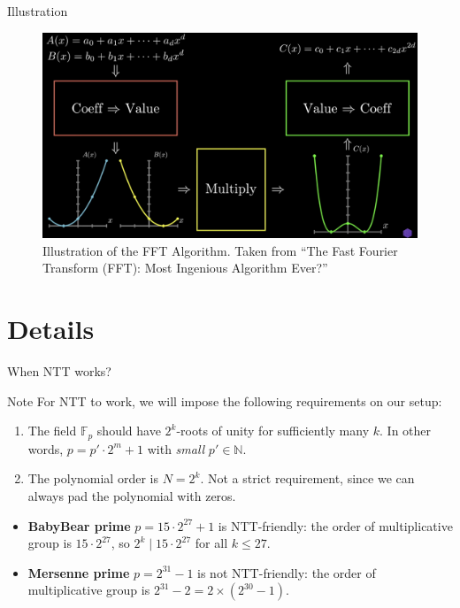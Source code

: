 \documentclass{zkdl-presentation-template}
\begin{document}
    \begin{frame}{Illustration}
        \begin{figure}
            \centering
            \includegraphics[width=\textwidth]{images/lecture_13/ntt_visualization.png}
            \caption{Illustration of the FFT Algorithm. Taken from ``The Fast Fourier Transform (FFT): Most Ingenious Algorithm Ever?''}
        \end{figure}
    \end{frame}

    \section{Details}

    \begin{frame}{When NTT works?}
        \begin{block}{Note}
            For NTT to work, we will impose the following requirements on 
            our setup:
            \begin{enumerate}
                \item The field $\mathbb{F}_p$ should have $2^k$-roots of unity for sufficiently many $k$. In other words, $p=p' \cdot 2^m + 1$ with \emph{small} $p' \in \mathbb{N}$.
                \item The polynomial order is $N=2^k$. Not a strict requirement, since we can always pad the polynomial with zeros.
            \end{enumerate}
        \end{block}

        \begin{example}
            \begin{itemize}
                \item \textbf{BabyBear prime} $p=15 \cdot 2^{27} + 1$ is NTT-friendly: the order of multiplicative
                group is $15 \cdot 2^{27}$, so $2^k \mid 15 \cdot 2^{27}$ for all $k \leq 27$.
                \item \textbf{Mersenne prime} $p=2^{31}-1$ is not NTT-friendly: the order of multiplicative 
                group is $2^{31}-2 = 2 \times (2^{30}-1)$.
            \end{itemize}
        \end{example}
    \end{frame}
\end{document}

